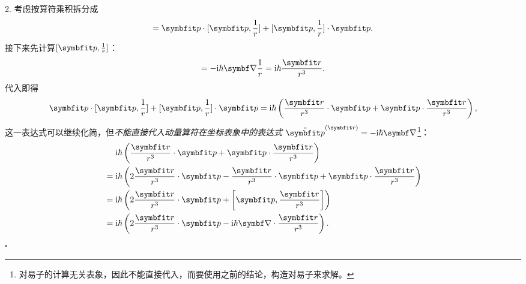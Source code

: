 \begin{tcolorbox}[breakable, title={\textbf{例题：两个对易子的计算}}]
    2. 考虑按算符乘积拆分成
    \begin{equation}
        [p^2,\frac{1}{r}] = \pp\cdot[\pp,\frac{1}{r}] + [\pp,\frac{1}{r}]\cdot\pp.
    \end{equation}
    接下来先计算$[\pp,\frac{1}{r}]$：
    \begin{equation}
        [\pp,\frac{1}{r}] = -\ii\hbar\del\frac{1}{r} = \ii\hbar\frac{\rr}{r^3}.
    \end{equation}
    代入即得
    \begin{equation}
        \pp\cdot[\pp,\frac{1}{r}] + [\pp,\frac{1}{r}]\cdot\pp = \ii\hbar\left( \frac{\rr}{r^3}\cdot\pp+\pp\cdot\frac{\rr}{r^3} \right),
    \end{equation}
    这一表达式可以继续化简，但\emph{不能直接代入动量算符在坐标表象中的表达式} $\hat{\pp}^{(\rr)}=-\ii\hbar\del$\footnote{对易子的计算无关表象，因此不能直接代入，而要使用之前的结论，构造对易子来求解。}：
    \begin{equation}
    \begin{aligned}
        &\quad\ \ii\hbar\left( \frac{\rr}{r^3}\cdot\pp+\pp\cdot\frac{\rr}{r^3} \right) \\
        &= \ii\hbar\left( 2\frac{\rr}{r^3}\cdot\pp - \frac{\rr}{r^3}\cdot\pp +\pp\cdot\frac{\rr}{r^3} \right) \\
        &= \ii\hbar\left( 2\frac{\rr}{r^3}\cdot\pp + \left[\pp, \frac{\rr}{r^3}\right] \right) \\
        &= \ii\hbar\left( 2\frac{\rr}{r^3}\cdot\pp - \ii\hbar\del\cdot\frac{\rr}{r^3} \right).
    \end{aligned}
    \end{equation}
    \hfill$\square$

\end{tcolorbox}

